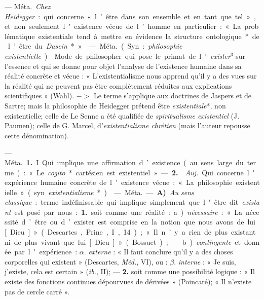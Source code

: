 \begin{itemize}[leftmargin=1cm, label=, itemsep=1pt]
 — \si{Méta.} {\it Chez Heidegger} :
qui concerne « l’être dans son ensemble et en tant que tel », et non
seulement l'existence vécue de
l’homme en particulier : « La problématique existentiale tend à mettre
en évidence la structure ontologique* de l’être du {\it Dasein}* ».

 — \si{Méta.} (Syn. : {\it philosophie existentielle}).
 Mode de philosopher qui pose le primat de
l’{\it exister}$^3$ sur l'essence et qui se
donne pour objet l’analyse de l’existence humaine dans sa réalité
concrète et vécue : « L’existentialisme
nous apprend qu'il y a des vues sur
la réalité qui ne peuvent pas être
complètement réduites aux explications scientifiques » (Wahl). $->$
Le terme s'applique aux doctrines
de Jaspers et de Sartre; mais la
philosophie de Heidegger prétend
être {\it existentiale}*, non existentielle;
celle de Le Senne a été qualifiée de
{\it spiritualisme existentiel} (J. Paumen);
celle de G. Marcel, d’{\it existentialisme
chrétien} (mais l’auteur repousse
cette dénomination).

 — \si{Méta.} {\bf 1.} I Qui implique
une affirmation d’existence (au sens
large du terme) : « Le {\it cogito}* cartésien est existentiel ».
— {\bf 2.}  {\it Auj.}
Qui concerne l'expérience humaine
concrète de l'existence vécue : « La
philosophie existentielle » (syn.
{\it existentialisme}*).

 — \si{Méta.} — {\bf A)} {\it Au sens classique} :
terme indéfinissable qui implique simplement que l'être dit
{\it existant} est posé par nous : {\bf 1.} soit
comme une réalité : a) {\it nécessaire} :
« La nécessité d’être ou d’exister est
comprise en la notion que nous
avons de lui [Dieu] » (Descartes,
Prine., I, 14) ; « Il n’y a rien de plus
existant ni de plus vivant que lui
[Dieu] » (Bossuet); — b) {\it contingente}
et donnée par l'expérience : $\alpha$. {\it externe} : « Il faut conclure
qu'il y a des choses corporelles qui existent » (Descartes, \si{{\it Méd.}},
VI), ou : $\beta$. {\it interne} : « Je suis, j'existe, cela est
certain » ({\it ib.}, II); — {\bf 2.} soit comme
une possibilité logique : « Il existe
des fonctions continues dépourvues
de dérivées » (Poincaré); « Il n'existe
pas de cercle carré ».


\end{itemize}
